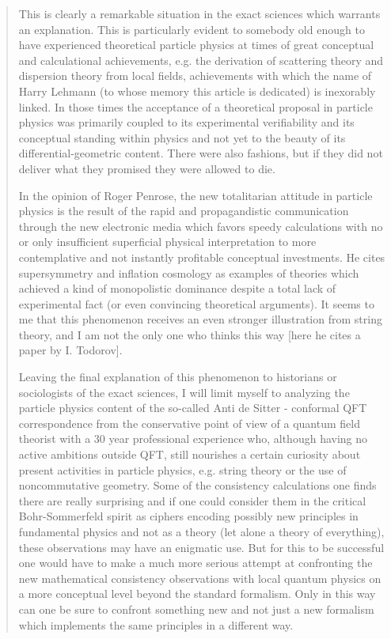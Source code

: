 \begin{quote}
      This is clearly a remarkable situation in the exact sciences
      which warrants an explanation.  This is particularly evident to
      somebody old enough to have experienced theoretical particle
      physics at times of great conceptual and calculational achievements,
      e.g. the derivation of scattering theory and dispersion theory
      from local fields, achievements with which the name of Harry
      Lehmann (to whose memory this article is dedicated) is inexorably
      linked.  In those times the acceptance of a theoretical proposal
      in particle physics was primarily coupled to its experimental
      verifiability and its conceptual standing within physics and not
      yet to the beauty of its differential-geometric content.  There 
      were also fashions, but if they did not deliver what they promised
      they were allowed to die. 

      In the opinion of Roger Penrose, the new totalitarian attitude in
      particle physics is the result of the rapid and propagandistic 
      communication through the new electronic media which favors 
      speedy calculations with no or only insufficient superficial
      physical interpretation to more contemplative and not instantly
      profitable conceptual investments.  He cites supersymmetry and
      inflation cosmology as examples of theories which achieved a 
      kind of monopolistic dominance despite a total lack of experimental
      fact (or even convincing theoretical arguments).  It seems to me
      that this phenomenon receives an even stronger illustration from
      string theory, and I am not the only one who thinks this way
      [here he cites a paper by I. Todorov].

      Leaving the final explanation of this phenomenon to historians
      or sociologists of the exact sciences, I will limit myself to
      analyzing the particle physics content of the so-called Anti
      de Sitter - conformal QFT correspondence from the conservative
      point of view of a quantum field theorist with a 30 year 
      professional experience who, although having no active ambitions
      outside QFT, still nourishes a certain curiosity about present
      activities in particle physics, e.g. string theory or the use
      of noncommutative geometry.  Some of the consistency calculations
      one finds there are really surprising and if one could consider
      them in the critical Bohr-Sommerfeld spirit as ciphers encoding
      possibly new principles in fundamental physics and not as a theory
      (let alone a theory of everything), these observations may have
      an enigmatic use.  But for this to be successful one would have
      to make a much more serious attempt at confronting the new
      mathematical consistency observations with local quantum physics
      on a more conceptual level beyond the standard formalism.  Only 
      in this way can one be sure to confront something new and not
      just a new formalism which implements the same principles in a
      different way.  


\end{quote}
